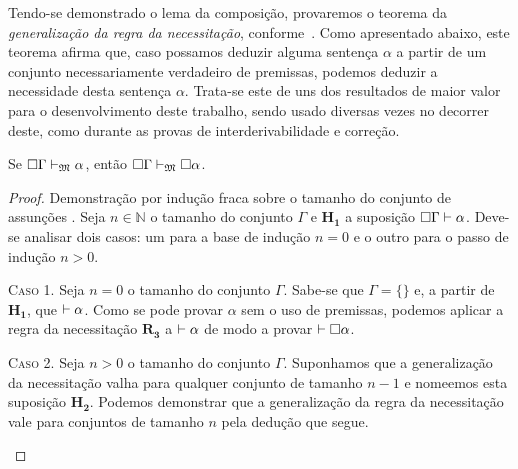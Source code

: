     \vspace{.5\baselineskip}
    Tendo-se demonstrado o lema da composição, provaremos o teorema da \emph{generalização da regra da necessitação}, conforme~\cite{Troelstra+Schwichtenberg.2000}.
    Como apresentado abaixo, este teorema afirma que, caso possamos deduzir alguma sentença $\alpha$ a partir de um conjunto necessariamente verdadeiro de premissas, podemos deduzir a necessidade desta sentença $\alpha$.
    Trata-se este de uns dos resultados de maior valor para o desenvolvimento deste trabalho, sendo usado diversas vezes no decorrer deste, como durante as provas de interderivabilidade e correção.

    \vspace{.5\baselineskip}
    \begin{tcolorbox}[enhanced jigsaw, breakable, sharp corners, colframe=black, colback=white, boxrule=0.5pt, left=1.5mm, right=1.5mm, top=1.5mm, bottom=1.5mm]
    \begin{theorem}\label{generalization}
        Se $\Box\Gamma\mathrel{\vdash}_{\mathfrak{M}}\alpha$, então $\Box\Gamma\mathrel{\vdash}_{\mathfrak{M}}\Box\alpha$.
        \begin{proof}
            Demonstração por indução fraca sobre o tamanho do conjunto de assunções \citep{Troelstra+Schwichtenberg.2000}.
            Seja $n\in\mathbb{N}$ o tamanho do conjunto $\Gamma$ e $\mathbf{H_1}$ a suposição $\Box\Gamma\mathrel{\vdash}\alpha$.
            Deve-se analisar dois casos: um para a base de indução $n=0$ e o outro para o passo de indução $n>0$.
            \begin{adjustwidth}{0pt}{}
            \vspace{.5\baselineskip}
            \textsc{Caso 1.}
            Seja $n=0$ o tamanho do conjunto $\Gamma$.
            Sabe-se que $\Gamma=\{\}$ e, a partir de $\mathbf{H_1}$, que ${\mathrel{\vdash}\alpha}$.
            Como se pode provar $\alpha$ sem o uso de premissas, podemos aplicar a regra da necessitação \hyperref[necessitation]{$\mathbf{R_3}$} a ${\mathrel{\vdash}\alpha}$ de modo a provar ${\mathrel{\vdash}\Box\alpha}$.
            \end{adjustwidth}
            \begin{case}
            \vspace{1\baselineskip}
            \textsc{Caso 2.} 
            Seja $n>0$ o tamanho do conjunto $\Gamma$.
            Suponhamos que a generalização da necessitação valha para qualquer conjunto de tamanho $n-1$ e nomeemos esta suposição $\mathbf{H_2}$.
            Podemos demonstrar que a generalização da regra da necessitação vale para conjuntos de tamanho $n$ pela dedução que segue.
            \end{case}


\end{proof}
\end{theorem}
\end{tcolorbox}
